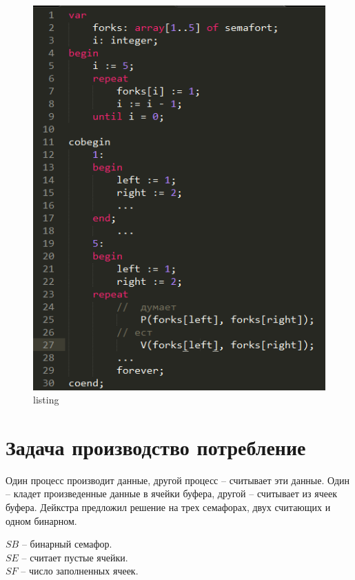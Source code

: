 \begin{figure}[H]
    \centering
    \includegraphics[width=\textwidth]{listing/1.png}
    \caption{listing}
\end{figure}

\section{Задача производство потребление}

Один процесс производит данные, другой процесс – считывает эти данные. Один – кладет произведенные данные в ячейки буфера, другой – считывает из ячеек буфера.  Дейкстра предложил решение на трех семафорах, двух считающих и одном бинарном. 

$SB$ – бинарный семафор.\\
$SE$ – считает пустые ячейки.\\
$SF$ – число заполненных ячеек.

